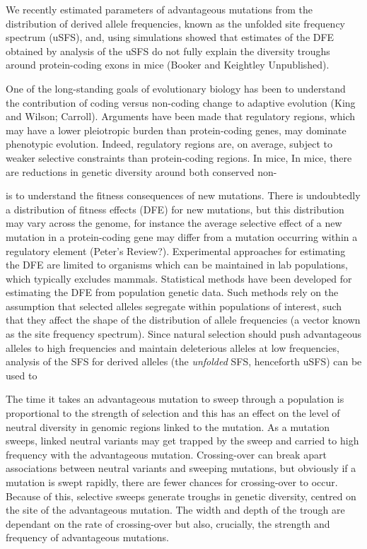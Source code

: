 \documentclass[11pt]{article}
\begin{document}
We recently estimated parameters of advantageous mutations from the distribution of derived allele frequencies, known as the unfolded site frequency spectrum (uSFS), and, using simulations showed that estimates of the DFE obtained by analysis of the uSFS do not fully explain the diversity troughs around protein-coding exons in mice (Booker and Keightley Unpublished). 



One of the long-standing goals of evolutionary biology has been to understand the contribution of coding versus non-coding change to adaptive evolution (King and Wilson; Carroll). Arguments have been made that regulatory regions, which may have a lower pleiotropic burden than protein-coding genes, may dominate phenotypic evolution. Indeed, regulatory regions are, on average,  subject to weaker selective constraints than protein-coding regions. In mice, 
In mice, there are reductions in genetic diversity around both conserved non-

 is to understand the fitness consequences of new mutations. There is undoubtedly a distribution of fitness effects (DFE) for new mutations, but this distribution may vary across the genome, for instance the average selective effect of a new mutation in a protein-coding gene may differ from a mutation occurring within a regulatory element (Peter's Review?). Experimental approaches for estimating the DFE are limited to organisms which can be maintained in lab populations, which typically excludes mammals. Statistical methods have been developed for estimating the DFE from population genetic data. Such methods rely on the assumption that selected alleles segregate within populations of interest, such that they affect the shape of the distribution of allele frequencies (a vector known as the site frequency spectrum). Since natural selection should push advantageous alleles to high frequencies and maintain deleterious alleles at low frequencies, analysis of the SFS for derived alleles (the \textit{unfolded} SFS, henceforth uSFS) can be used to 

The time it takes an advantageous mutation to sweep through a population is proportional to the strength of selection and this has an effect on the level of neutral diversity in genomic regions linked to the mutation. As a mutation sweeps, linked neutral variants may get trapped by the sweep and carried to high frequency with the advantageous mutation. Crossing-over can break apart associations between neutral variants and sweeping mutations, but obviously if a mutation is swept rapidly, there are fewer chances for crossing-over to occur. Because of this, selective sweeps generate troughs in genetic diversity, centred on the site of the advantageous mutation. The width and depth of the trough are dependant on the rate of crossing-over but also, crucially, the strength and frequency of advantageous mutations.
\end{document}
